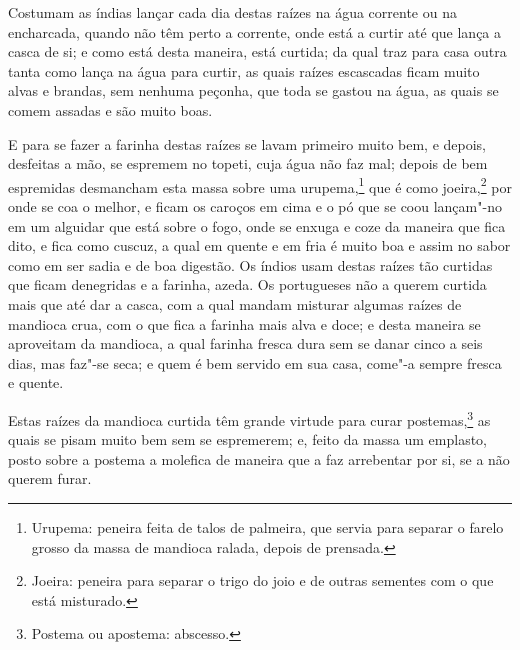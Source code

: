 Costumam as índias lançar cada dia destas raízes na água corrente ou na encharcada, quando
não têm perto a corrente, onde está a curtir até que lança a casca de si; e como está
desta maneira, está curtida; da qual traz para casa outra tanta como lança na água para
curtir, as quais raízes escascadas ficam muito alvas e brandas, sem nenhuma peçonha, que
toda se gastou na água, as quais se comem assadas e são muito boas.

E para se fazer a farinha destas raízes se lavam primeiro muito bem, e depois, desfeitas a
mão, se espremem no topeti, cuja água não faz mal; depois de
bem espremidas desmancham esta massa sobre uma urupema,\footnote{ Urupema: peneira feita
de talos de palmeira, que servia para separar o farelo grosso da massa de mandioca ralada,
depois de prensada.} que é como joeira,\footnote{ Joeira: peneira para separar o trigo do
joio e de outras sementes com o que está misturado.} por onde se coa o melhor, e ficam os
caroços em cima e o pó que se coou lançam"-no em um alguidar que está sobre o fogo, onde se
enxuga e coze da maneira que fica dito, e fica como cuscuz, a qual em quente e em fria é
muito boa e assim no sabor como em ser sadia e de boa digestão. Os índios usam destas
raízes tão curtidas que ficam denegridas e a farinha, azeda. Os portugueses não a querem
curtida mais que até dar a casca, com a qual mandam misturar algumas raízes de mandioca
crua, com o que fica a farinha mais alva e doce; e desta maneira se aproveitam da
mandioca, a qual farinha fresca dura sem se danar cinco a seis dias, mas faz"-se seca; e
quem é bem servido em sua casa, come"-a sempre fresca e quente.

Estas raízes da mandioca curtida têm grande virtude para curar postemas,\footnote{ Postema
ou apostema: abscesso.} as quais se pisam muito bem sem se espremerem; e, feito da massa
um emplasto, posto sobre a postema a molefica de maneira que a faz arrebentar por si, se a
não querem furar.

